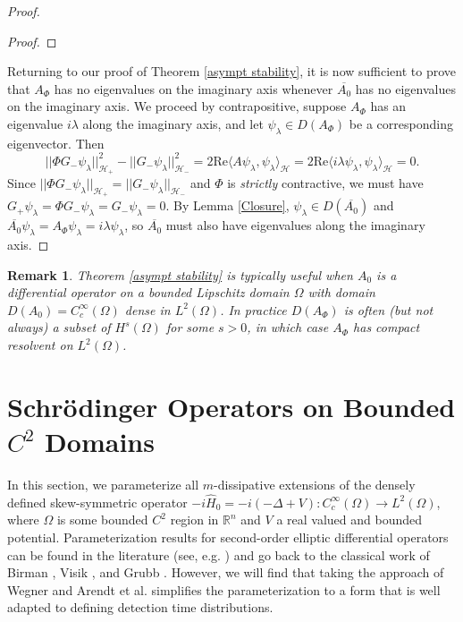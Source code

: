 \documentclass{article}
\numberwithin{equation}{section}
\newtheorem{remark}{Remark}[section]
\begin{document}
\begin{proof}
\begin{proof}
\end{proof}
Returning to our proof of Theorem \ref{asympt stability}, it is now sufficient to prove that $A_\Phi$ has no eigenvalues on the imaginary axis whenever $\overline{A_0}$ has no eigenvalues on the imaginary axis. We proceed by contrapositive, suppose $A_\Phi$ has an eigenvalue $i\lambda$ along the imaginary axis, and let $\psi_\lambda\in D(A_\Phi)$ be a corresponding eigenvector. Then 
\begin{equation}
   ||\Phi G_-\psi_\lambda||_{\mathcal{H}_+}^2- ||G_-\psi_\lambda||_{\mathcal{H}_-}^2=2\text{Re}\langle A\psi_\lambda, \psi_\lambda \rangle_{\mathcal{H}}=2\text{Re}\langle i\lambda \psi_\lambda,\psi_\lambda \rangle_{\mathcal{H}}=0. 
\end{equation}
Since $||\Phi G_- \psi_\lambda||_{\mathcal{H}_+}=||G_-\psi_\lambda||_{\mathcal{H}_-}$ and $\Phi$ is \textit{strictly} contractive, we must have $G_+\psi_\lambda=\Phi G_- \psi_\lambda=G_-\psi_\lambda=0$. By Lemma \ref{Closure}, $\psi_\lambda \in D(\overline{A_0})$ and $\overline{A_0}\psi_\lambda=A_\Phi \psi_\lambda=i\lambda\psi_\lambda$, so $\overline{A_0}$ must also have eigenvalues along the imaginary axis. 
\end{proof}
\begin{remark}
    Theorem \ref{asympt stability} is typically useful when $A_0$ is a differential operator on a bounded Lipschitz domain $\Omega$ with domain $D(A_0)=C_c^\infty(\Omega)$ dense in $L^2(\Omega)$. In practice $D(A_\Phi)$ is often (but not always) a subset of $H^s(\Omega)$ for some $s>0$, in which case $A_\Phi$ has compact resolvent on $L^2(\Omega)$.
\end{remark}
\section{Schr\"odinger Operators on Bounded $C^2$ Domains}
In this section, we parameterize all $m$-dissipative extensions of the densely defined skew-symmetric operator $-i\hat{H}_0=-i(-\Delta + V): C_c^\infty(\Omega)\to L^2(\Omega)$, where $\Omega$ is some bounded $C^2$ region in $\mathbb{R}^n$ and $V$ a real valued and bounded potential. Parameterization results for second-order elliptic differential operators can be found in the literature (see, e.g. \cite{Gesztesy11,BEHRNDT2014}) and go back to the classical work of Birman \cite{Bir56}, Visik \cite{Visik}, and Grubb \cite{Grubb1968ACO}. However, we will find that taking the approach of Wegner \cite{Wegner2017} and Arendt et al. \cite{Arendt2023} simplifies the parameterization to a form that is well adapted to defining detection time distributions.  
\end{document}
